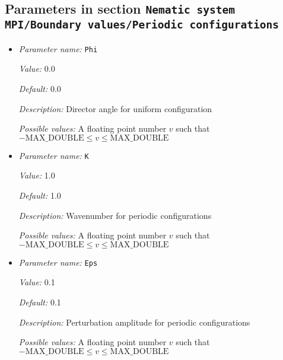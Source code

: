 \subsection{Parameters in section \tt Nematic system MPI/Boundary values/Periodic configurations}
\label{parameters:Nematic_20system_20MPI/Boundary_20values/Periodic_20configurations}

\begin{itemize}
\item {\it Parameter name:} {\tt Phi}
\label{parameters:Nematic system MPI/Boundary values/Periodic configurations/Phi}
\label{parameters:Nematic_20system_20MPI/Boundary_20values/Periodic_20configurations/Phi}


{\it Value:} 0.0


{\it Default:} 0.0


{\it Description:} Director angle for uniform configuration


{\it Possible values:} A floating point number $v$ such that $-\text{MAX\_DOUBLE} \leq v \leq \text{MAX\_DOUBLE}$
\item {\it Parameter name:} {\tt K}
\label{parameters:Nematic system MPI/Boundary values/Periodic configurations/K}
\label{parameters:Nematic_20system_20MPI/Boundary_20values/Periodic_20configurations/K}


{\it Value:} 1.0


{\it Default:} 1.0


{\it Description:} Wavenumber for periodic configurations


{\it Possible values:} A floating point number $v$ such that $-\text{MAX\_DOUBLE} \leq v \leq \text{MAX\_DOUBLE}$
\item {\it Parameter name:} {\tt Eps}
\label{parameters:Nematic system MPI/Boundary values/Periodic configurations/Eps}
\label{parameters:Nematic_20system_20MPI/Boundary_20values/Periodic_20configurations/Eps}


{\it Value:} 0.1


{\it Default:} 0.1


{\it Description:} Perturbation amplitude for periodic configurations


{\it Possible values:} A floating point number $v$ such that $-\text{MAX\_DOUBLE} \leq v \leq \text{MAX\_DOUBLE}$
\end{itemize}
